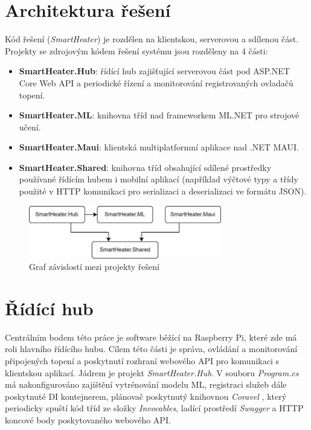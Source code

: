 \section{Architektura řešení}
Kód řešení ({\it SmartHeater}) je rozdělen na klientskou, serverovou a sdílenou část. Projekty se zdrojovým kódem řešení systému jsou rozděleny na 4 části:
\begin{itemize}
    \item \textbf{SmartHeater.Hub}: řídící hub zajišťující serverovou část pod ASP.NET Core Web API a periodické řízení a monitorování registrovaných ovladačů topení.
    \item \textbf{SmartHeater.ML}: knihovna tříd nad frameworkem ML.NET pro strojové učení.
    \item \textbf{SmartHeater.Maui}: klientská multiplatformní aplikace nad .NET MAUI.
    \item \textbf{SmartHeater.Shared}: knihovna tříd obsahující sdílené prostředky používané řídícím hubem i mobilní aplikací (například výčtové typy a třídy použité v HTTP komunikaci pro serializaci a deserializaci ve formátu JSON).
\end{itemize}

\begin{figure}[hbt]
\centering
\includegraphics[width=0.75\textwidth]{obrazky-figures/smartheater-architecture.png}
\caption{Graf závislostí mezi projekty řešení}
\end{figure}

\pagebreak

\section{Řídící hub}
Centrálním bodem této práce je software běžící na Raspberry Pi, které zde má roli hlavního řídícího hubu. Cílem této části je správa, ovládání a monitorování připojených topení a poskytnutí rozhraní webového API pro komunikaci s klientskou aplikací. Jádrem je projekt {\it SmartHeater.Hub}. V souboru {\it Program.cs} má nakonfigurováno zajištění vytrénování modelu ML, registraci služeb dále poskytnuté DI kontejnerem, plánovač poskytnutý knihovnou {\it Coravel} \cite{coravel}, který periodicky spuští kód tříd ze složky {\it Invocables}, ladící prostředí {\it Swagger} a HTTP koncové body poskytovaného webového API.

